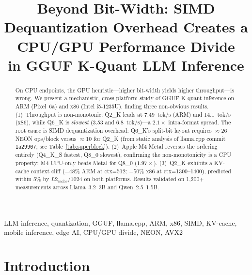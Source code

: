 \documentclass[conference]{IEEEtran}
\begin{document}
\title{Beyond Bit-Width: SIMD Dequantization Overhead Creates a CPU/GPU Performance Divide\\
in GGUF K-Quant LLM Inference}

\author{
}

\maketitle

\begin{abstract}
On CPU endpoints, the GPU heuristic---higher bit-width yields higher throughput---is wrong.
We present a mechanistic, cross-platform study of GGUF K-quant inference on ARM (Pixel~6a)
and x86 (Intel i5-1235U), finding three non-obvious results.
(1)~Throughput is non-monotonic: Q2\_K leads at 7.49~tok/s (ARM) and 14.1~tok/s (x86),
while Q6\_K is \emph{slowest} (3.53 and 6.8~tok/s)---a $2.1\times$ intra-format spread.
The root cause is SIMD dequantization overhead: Q6\_K's split-bit layout requires
$\approx$26 NEON ops/block versus $\approx$10 for Q2\_K (from static analysis of
llama.cpp commit \texttt{1a29907}; see Table~\ref{tab:superblock}).
(2)~Apple M4 Metal reverses the ordering entirely (Q4\_K\_S fastest, Q8\_0 slowest),
confirming the non-monotonicity is a CPU property; M4 CPU-only beats Metal for Q8\_0
($1.97\times$).
(3)~Q2\_K exhibits a KV-cache context cliff ($-48\%$ ARM at ctx=512; $-50\%$ x86 at
ctx=1300--1400), predicted within 5\% by $L2_\text{cache}/1024$ on both platforms.
Results validated on 1,200+ measurements across Llama~3.2~3B and Qwen~2.5~1.5B.
\end{abstract}

\begin{IEEEkeywords}
LLM inference, quantization, GGUF, llama.cpp, ARM, x86, SIMD, KV-cache,
mobile inference, edge AI, CPU/GPU divide, NEON, AVX2
\end{IEEEkeywords}

\section{Introduction}
\end{document}
